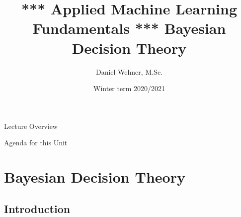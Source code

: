 


\title[Decision Theory]{*** Applied Machine Learning Fundamentals *** Bayesian Decision Theory}
\author{Daniel Wehner, M.Sc.}
\date{Winter term 2020/2021}




\maketitlepage


\begin{frame}{Lecture Overview}{}
\end{frame}


\begin{frame}{Agenda for this Unit}
	\begin{multicols}{2}
		\tableofcontents
	\end{multicols}
\end{frame}


\section{Bayesian Decision Theory}

\subsection{Introduction}

